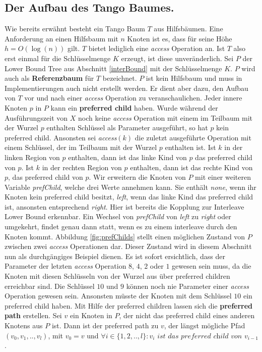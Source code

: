 \documentclass[a4paper,12pt]{article}
\begin{document}
\subsection{Der Aufbau des Tango Baumes.} \label{aufbauDesTango}
Wie bereits erwähnt besteht ein Tango Baum $T$ aus Hilfsbäumen. Eine Anforderung an einen Hilfsbaum mit $n$ Knoten ist es, dass für seine Höhe $h = O\left(\log\left( n\right)\right)$ gilt. $T$ bietet lediglich eine \textit{access} Operation an. Ist $T$ also erst einmal für die  Schlüsselmenge $K$ erzeugt, ist diese unveränderlich. Sei $P$ der Lower Bound Tree aus Abschnitt \ref{interBound} mit der Schlüsselmenge $K$. $P$ wird auch als \textbf{Referenzbaum} für $T$ bezeichnet. $P$ ist kein Hilfsbaum und muss in Implementierungen auch nicht erstellt werden. Er dient aber dazu, den Aufbau von $T$ vor und nach einer \textit{access} Operation zu veranschaulichen. Jeder innere Knoten $p$ in $P$ kann ein \textbf{preferred child} haben.  Wurde während der Ausführungszeit von $X$ noch keine \textit{access} Operation mit einem im Teilbaum mit der Wurzel $p$ enthalten Schlüssel als Parameter ausgeführt, so hat $p$ kein preferred child. Ansonsten sei \textit{access}$\left(k\right)$ die zuletzt ausgeführte Operation mit einem Schlüssel, der im Teilbaum mit der Wurzel $p$ enthalten ist. Ist $k$ in der linken Region von $p$ enthalten, dann ist das linke Kind von $p$ das preferred child von $p$. Ist $k$ in der rechten Region von $p$ enthalten, dann ist das rechte Kind von $p$, das preferred child von $p$. Wir erweitern die Knoten von $P$ mit einer weiteren Variable \textit{prefChild}, welche drei Werte annehmen kann. Sie enthält \textit{none}, wenn ihr Knoten kein preferred child besitzt, \textit{left}, wenn das linke Kind das preferred child ist, ansonsten entsprechend \textit{right}. Hier ist bereits die Kopplung zur Interleave Lower Bound erkennbar. Ein Wechsel von \textit{prefChild}  von \textit{left} zu \textit{right} oder umgekehrt, findet genau dann statt, wenn es zu einem interleave durch den Knoten kommt. Abbildung \ref{fig:prefChilds} stellt einen möglichen Zustand von $P$ zwischen zwei \textit{access} Operationen dar. Dieser Zustand wird in diesem Abschnitt nun als durchgängiges Beispiel dienen. Es ist sofort ersichtlich, dass der Parameter der letzten \textit{access} Operation $8$, $4$, $2$ oder $1$ gewesen sein muss, da die Knoten mit diesen Schlüsseln von der Wurzel aus über preferred children erreichbar sind. Die Schlüssel $10$ und $9$ können noch nie Parameter einer \textit{access} Operation gewesen sein. Ansonsten müsste der Knoten mit dem Schlüssel $10$ ein preferred child haben. Mit Hilfe der preferred children lassen sich die \textbf{preferred path} erstellen. Sei $v$ ein Knoten in $P$, der nicht das preferred child eines anderen Knotens aus $P$ ist. Dann ist der preferred path zu $v$, der längst mögliche Pfad $\left(v_0, v_1,..,v_l\right)$, mit $v_0 = v$ und $\forall i \in \{1,2,..,l\} \colon v_i \textit{ ist das preferred child von }v_{i-1   }$.  
\end{document}
